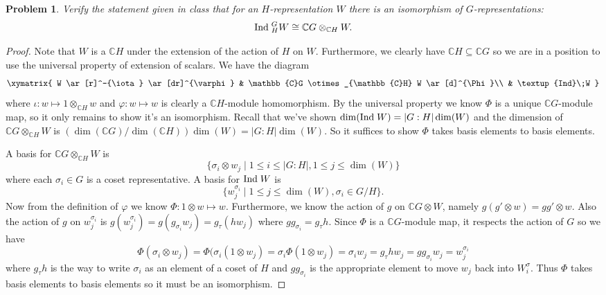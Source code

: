 \documentclass{article}
\newcommand{\ind}{\textup{Ind}\;}
\newtheorem{problem}{Problem}
\begin{document}
\begin{problem}
Verify the statement given in class that for an $H$-representation $W$ there is an isomorphism of $G$-representations:
\[
\ind_H^G W \cong \mathbb{C}G \otimes_{\mathbb{C}H} W.
\]
\end{problem}
\begin{proof}
Note that $W$ is a $\mathbb{C}H$ under the extension of the action of $H$ on $W$. Furthermore, we clearly have $\mathbb{C}H \subseteq \mathbb{C}G$ so we are in a position to use the universal property of extension of scalars. We have the diagram
\[
\xymatrix{
W \ar[r]^-{\iota} \ar[dr]^{\varphi} & \mathbb{C}G \otimes_{\mathbb{C}H} W \ar[d]^{\Phi}\\
& \ind W
}
\]
where $\iota : w \mapsto 1 \otimes_{\mathbb{C}H} w$ and $\varphi : w \mapsto w$ is clearly a $\mathbb{C}H$-module homomorphism. By the universal property we know $\Phi$ is a unique $\mathbb{C}G$-module map, so it only remains to show it's an isomorphism. Recall that we've shown $\dim(\ind W) = |G : H| \dim(W)$ and the dimension of $\mathbb{C}G \otimes_{\mathbb{C}H} W$ is $(\dim(\mathbb{C}G)/\dim(\mathbb{C}H)) \dim(W) = |G : H| \dim(W)$. So it suffices to show $\Phi$ takes basis elements to basis elements.

A basis for $\mathbb{C}G \otimes_{\mathbb{C}H} W$ is
\[
\{\sigma_i \otimes w_j \mid 1 \leq i \leq |G : H|, 1 \leq j \leq \dim(W)\}
\]
where each $\sigma_i \in G$ is a coset representative. A basis for $\ind W$ is
\[
\{w_j^{\sigma_i} \mid 1 \leq j \leq \dim(W), \sigma_i \in G/H\}.
\]
Now from the definition of $\varphi$ we know $\Phi : 1 \otimes w \mapsto w$. Furthermore, we know the action of $g$ on $\mathbb{C}G \otimes W$, namely $g(g' \otimes w) = gg' \otimes w$. Also the action of $g$ on $w_j^{\sigma_i}$ is $g(w_j^{\sigma_i}) = g(g_{\sigma_i}w_j) = g_{\tau}(hw_j)$ where $gg_{\sigma_i} = g_{\tau}h$. Since $\Phi$ is a $\mathbb{C}G$-module map, it respects the action of $G$ so we have
\[
\Phi(\sigma_i \otimes w_j) = \Phi(\sigma_i(1 \otimes w_j) = \sigma_i \Phi(1 \otimes w_j) = \sigma_i w_j = g_{\tau} h w_j = g g_{\sigma_i} w_j = w_j^{\sigma_i}
\]
where $g_{\tau} h$ is the way to write $\sigma_i$ as an element of a coset of $H$ and $gg_{\sigma_i}$ is the appropriate element to move $w_j$ back into $W^\sigma_i$. Thus $\Phi$ takes basis elements to basis elements so it must be an isomorphism.
\end{proof}
\end{document}
